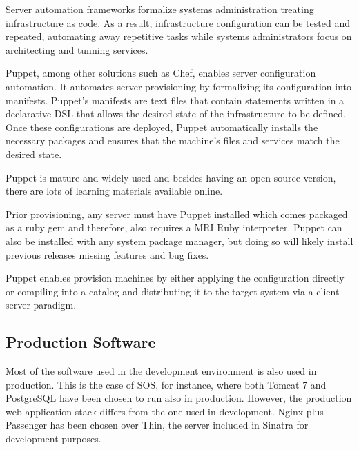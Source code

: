 Server automation frameworks formalize systems administration treating infrastructure as code. As a result, infrastructure configuration can be tested and repeated, automating away repetitive tasks while systems administrators focus on architecting and tunning services.

Puppet, among other solutions such as Chef, enables server configuration automation. It automates server provisioning by formalizing its configuration into manifests. Puppet's manifests are text files that contain statements written in a declarative DSL that allows the desired state of the infrastructure to be defined. Once these configurations are deployed, Puppet automatically installs the necessary packages and ensures that the machine’s files and services match the desired state.


Puppet is mature and widely used and besides having an open source version, there are lots of learning materials available online.

Prior provisioning, any server must have Puppet installed which comes packaged as a ruby gem and therefore, also requires a MRI Ruby interpreter. Puppet can also be installed with any system package manager, but doing so will likely install previous releases missing features and bug fixes.

Puppet enables provision machines by either applying the configuration directly or compiling into a catalog and distributing it to the target system via a client-server paradigm.

\subsection*{Production Software}

Most of the software used in the development environment is also used in production. This is the case of SOS, for instance, where both Tomcat 7 and PostgreSQL have been chosen to run also in production. However, the production web application stack differs from the one used in development. Nginx plus Passenger has been chosen over Thin, the server included in Sinatra for development purposes.

